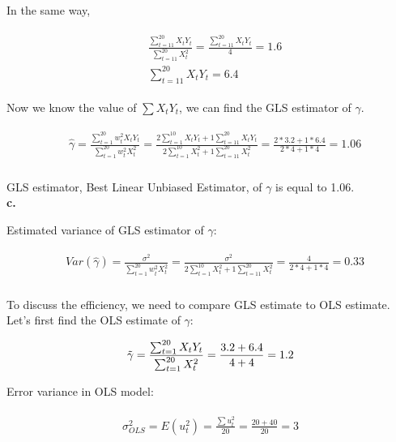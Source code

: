 \documentclass{article}
\begin{document}
In the same way,

\begin{align}
    \begin{split}
         & \frac{\sum_{t=11}^{20} X_t Y_t}{\sum_{t=11}^{20} X_t^2} = \frac{\sum_{t=11}^{20} X_t Y_t}{4} = 1.6 \\
         & \sum_{t=11}^{20} X_t Y_t = 6.4
    \end{split}
\end{align}

Now we know the value of $\sum X_t Y_t$, we can find the GLS estimator of $\gamma$.

\begin{align}
    \begin{split}
        & \hat{\gamma} = \frac{\sum_{t=1}^{20} w_t^2 X_t Y_t}{\sum_{t=1}^{20} w_t^2 X_t^2} = \frac{2\sum_{t=1}^{10} X_t Y_t + 1\sum_{t=11}^{20} X_t Y_t}{2\sum_{t=1}^{10}X_t^2 + {1\sum_{t=11}^{20}X_t^2}} = \frac{2*3.2 + 1*6.4}{2*4 + 1*4} = 1.06
    \end{split}
\end{align}
\\

GLS estimator, Best Linear Unbiased Estimator, of $\gamma$ is equal to 1.06.
\\

\textbf{c.}

Estimated variance of GLS estimator of $\gamma$:

\begin{align}
    \begin{split}
        & Var(\hat{\gamma}) = \frac{\sigma^2}{\sum_{t=1}^{20} w_t^2 X_t^2} = \frac{\sigma^2}{2\sum_{t=1}^{10}X_t^2 + {1\sum_{t=11}^{20}X_t^2}} = \frac{4}{2*4 + 1*4} = 0.33
    \end{split}
\end{align}
\\

To discuss the efficiency, we need to compare GLS estimate to OLS estimate. Let's first find the OLS estimate of $\gamma$:

\begin{align}
    \begin{split}
        \Tilde{\gamma} = \frac{\sum_{t=1}^{20} X_t Y_t}{\sum_{t=1}^{20} X_t^2} = \frac{3.2 + 6.4}{4 + 4} = 1.2
    \end{split}
\end{align}

Error variance in OLS model:

\begin{align}
    \begin{split}
        \sigma^2_{OLS} = E(u_t^2) = \frac{\sum u_t^2}{20} = \frac{20 + 40}{20} = 3
    \end{split}
\end{align}
\end{document}
